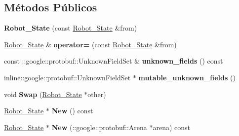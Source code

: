 \subsection*{Métodos Públicos}
\begin{DoxyCompactItemize}
\item 
{\bfseries Robot\+\_\+\+State} (const \hyperlink{classvss__state_1_1Robot__State}{Robot\+\_\+\+State} \&from)\hypertarget{classvss__state_1_1Robot__State_a067b968ee504ea53efd93d9aa27c96ca}{}\label{classvss__state_1_1Robot__State_a067b968ee504ea53efd93d9aa27c96ca}

\item 
\hyperlink{classvss__state_1_1Robot__State}{Robot\+\_\+\+State} \& {\bfseries operator=} (const \hyperlink{classvss__state_1_1Robot__State}{Robot\+\_\+\+State} \&from)\hypertarget{classvss__state_1_1Robot__State_ad37aa84870eea581e0406cfb5db502ac}{}\label{classvss__state_1_1Robot__State_ad37aa84870eea581e0406cfb5db502ac}

\item 
const \+::google\+::protobuf\+::\+Unknown\+Field\+Set \& {\bfseries unknown\+\_\+fields} () const \hypertarget{classvss__state_1_1Robot__State_a12a57833a931bfb941527d777fb1d99a}{}\label{classvss__state_1_1Robot__State_a12a57833a931bfb941527d777fb1d99a}

\item 
inline\+::google\+::protobuf\+::\+Unknown\+Field\+Set $\ast$ {\bfseries mutable\+\_\+unknown\+\_\+fields} ()\hypertarget{classvss__state_1_1Robot__State_adda3db07f10ebdb69699bb992976ace3}{}\label{classvss__state_1_1Robot__State_adda3db07f10ebdb69699bb992976ace3}

\item 
void {\bfseries Swap} (\hyperlink{classvss__state_1_1Robot__State}{Robot\+\_\+\+State} $\ast$other)\hypertarget{classvss__state_1_1Robot__State_a4f0475b13ab71a00c88f4662e82decea}{}\label{classvss__state_1_1Robot__State_a4f0475b13ab71a00c88f4662e82decea}

\item 
\hyperlink{classvss__state_1_1Robot__State}{Robot\+\_\+\+State} $\ast$ {\bfseries New} () const \hypertarget{classvss__state_1_1Robot__State_ac7c2f86026d390635f40306421511edd}{}\label{classvss__state_1_1Robot__State_ac7c2f86026d390635f40306421511edd}

\item 
\hyperlink{classvss__state_1_1Robot__State}{Robot\+\_\+\+State} $\ast$ {\bfseries New} (\+::google\+::protobuf\+::\+Arena $\ast$arena) const \hypertarget{classvss__state_1_1Robot__State_aa802503ef36b7df6e88c544913d9cc43}{}\label{classvss__state_1_1Robot__State_aa802503ef36b7df6e88c544913d9cc43}


\end{DoxyCompactItemize}
